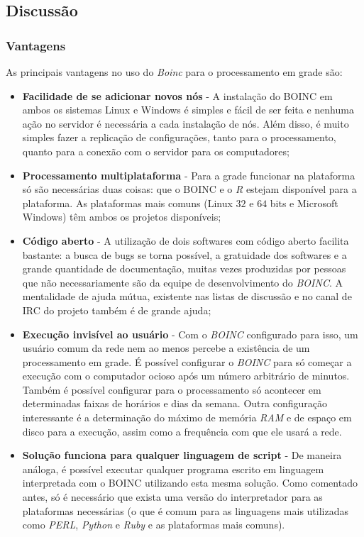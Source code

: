 \subsection{Discussão}



\subsubsection{Vantagens} 

As principais vantagens no uso do \emph{Boinc} para o processamento em grade são:

\begin{itemize}
  \item \textbf{Facilidade de se adicionar novos nós} - A instalação do BOINC em ambos os sistemas Linux e Windows é simples
e fácil de ser feita e nenhuma ação no servidor é necessária a cada instalação de nós. Além disso, é muito simples fazer
a replicação de configurações, tanto para o processamento, quanto para a conexão com o servidor para os computadores;
  \item \textbf{Processamento multiplataforma} - Para a grade funcionar na plataforma só são necessárias duas coisas: 
que o BOINC e o \emph{R} estejam disponível para a plataforma. As plataformas mais comuns 
(Linux $32$ e $64$ bits e Microsoft Windows) têm ambos os projetos disponíveis;
  \item \textbf{Código aberto} - A utilização de dois softwares com código aberto facilita bastante: a 
busca de bugs se torna possível, a gratuidade dos softwares e a grande quantidade de documentação, muitas vezes produzidas por
pessoas que não necessariamente são da equipe de desenvolvimento do \emph{BOINC}. A mentalidade de ajuda mútua, existente nas
listas de discussão e no canal de IRC do projeto também é de grande ajuda; 
  \item \textbf{Execução invisível ao usuário} - Com o \emph{BOINC} configurado para isso, um usuário comum da rede nem ao menos 
percebe a existência de um processamento em grade. É possível configurar o \emph{BOINC} para só começar a execução com o computador ocioso
após um número arbitrário de minutos. Também é possível configurar para o processamento só acontecer em determinadas 
faixas de horários e dias da semana. Outra configuração interessante é a determinação do máximo de memória 
\emph{RAM} e de espaço em disco para a execução, assim como a frequência com que ele usará a rede. 
  \item \textbf{Solução funciona para qualquer linguagem de script} - De maneira análoga, é possível executar qualquer programa escrito em 
linguagem interpretada com o BOINC utilizando esta mesma solução. Como comentado antes, só é necessário que exista uma versão do interpretador
para as plataformas necessárias (o que é comum para as linguagens mais utilizadas como \emph{PERL}, \emph{Python} e 
\emph{Ruby} e as plataformas mais comuns). 

\end{itemize}

